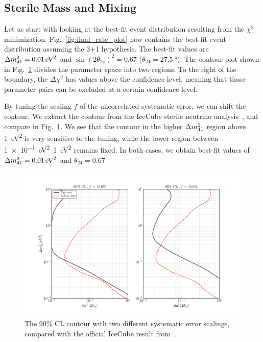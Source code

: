 \subsection{Sterile Mass and Mixing}
Let us start with looking at the best-fit event distribution resulting from the $\chi^2$ minimization.
Fig.~\ref{fig:final_rate_plot} now contains the best-fit event distribution assuming the 3+1 hypothesis.
The best-fit values are $\dm[41] = \SI{0.01}{\eV\squared}$ and 
$\sin(2\theta_{24})^2 = 0.67$ ($\theta_{24} = \SI{27.5}{\degree}$). %
The contour plot shown in Fig.~\ref{fig:error_tuning} divides the parameter space into two regions.
To the right of the boundary, the $\Delta \chi^2$ has values above the confidence level, meaning that 
those parameter pairs can be excluded at a certain confidence level.

By tuning the scaling $f$ of the uncorrelated systematic error, we can shift the contour. We extract the contour from the 
IceCube sterile neutrino analysis~\cite{IC2020}, and compare in Fig.~\ref{fig:error_tuning}. We see that the contour in the 
higher $\dm[41]$ region above \SI{1}{\eV\squared} is very sensitive to the tuning, while the lower region between \SIrange[]{1e-1}{1}{\eV\squared}
remains fixed. In both cases, we obtain best-fit values of $\dm[41] = \SI{0.01}{\eV^2}$ and $\theta_{24} = 0.67$
\begin{figure}
    \centering
    \includegraphics[scale=0.58]{figures/s24_error_tuning.pdf}
    \caption{The 90\% CL contour with two different systematic error scalings, compared 
    with the official IceCube result from~\cite{IC2020}.}\label{fig:error_tuning}
\end{figure}

